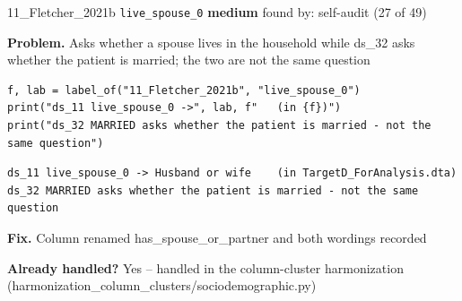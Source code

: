 \documentclass[9pt, t, handout]{beamer}
\newcommand{\ans}[1]{\textcolor{structure.fg}{#1}}
\begin{document}
\begin{frame}[fragile]{11\_Fletcher\_2021b \quad \texttt{live\_spouse\_0}}
  {\scriptsize\textcolor{blue!55!black}{\textbf{medium}} \quad
   found by: self-audit \quad (27 of 49)}
  \vspace{3pt}

  {\footnotesize \textbf{Problem.} Asks whether a spouse lives in the household while ds\_32 asks whether the patient is married; the two are not the same question}
  \vspace{4pt}

  \begin{Verbatim}[fontsize=\tiny, frame=single, framesep=2pt, label=\tiny reproduce]
f, lab = label_of("11_Fletcher_2021b", "live_spouse_0")
print("ds_11 live_spouse_0 ->", lab, f"   (in {f})")
print("ds_32 MARRIED asks whether the patient is married - not the same question")
  \end{Verbatim}
  \begin{Verbatim}[fontsize=\tiny, frame=single, framesep=2pt, label=\tiny output]
ds_11 live_spouse_0 -> Husband or wife    (in TargetD_ForAnalysis.dta)
ds_32 MARRIED asks whether the patient is married - not the same question
  \end{Verbatim}
  \vspace{2pt}

  {\footnotesize \textbf{Fix.} Column renamed has\_spouse\_or\_partner and both wordings recorded}
  \vspace{2pt}

  {\footnotesize \textbf{Already handled?} \ans{Yes} -- handled in the column-cluster harmonization
   (harmonization\_column\_clusters/sociodemographic.py)}
\end{frame}
\end{document}
